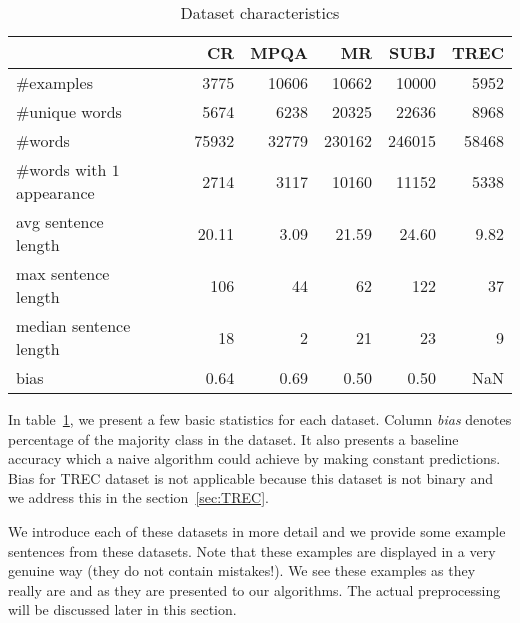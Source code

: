    \begin{table}[h]
    \begin{center}
    
    \begin{tabular}{l|rrrrr}
    \toprule
    {} &        CR &      MPQA &         MR &      SUBJ &      TREC \\\hline
    \midrule
    \#examples                                &   3775 &  10606 &   10662 &   10000 &   5952 \\\hline
    \#unique words                            &   5674 &   6238 &   20325 &   22636 &   8968 \\\hline
    \#words                                   &  75932 &  32779 &  230162 &  246015 &  58468 \\\hline
    \specialcell{\#words with\\$1$ appearance} &   2714 &   3117 &   10160 &   11152 &   5338 \\\hline
    \specialcell{avg sentence\\length}       &     20.11 &      3.09 &      21.59 &      24.60 &      9.82 \\\hline
    \specialcell{max sentence\\length}       &    106 &     44 &      62 &     122 &     37 \\\hline
    \specialcell{median sentence\\length}    &     18 &      2 &      21 &      23 &      9 \\\hline
    bias                                     &      0.64 &      0.69 &       0.50 &       0.50 &       NaN \\
    \bottomrule
    \end{tabular}
    
    \caption[Dataset characteristics]{Dataset characteristics}
    \label{tab:datasets:stats}
    \end{center}
    \end{table}


    In table~\ref{tab:datasets:stats}, we present a few basic statistics for each dataset.
    Column \emph{bias} denotes percentage of the majority class in the dataset.
    It also presents a baseline accuracy which a naive algorithm could achieve by making constant predictions. 
    Bias for TREC dataset is not applicable because this dataset is not binary and we address this in the section~\ref{sec:TREC}.
    
    We introduce each of these datasets in more detail and we provide some example sentences from these datasets.
    Note that these examples are displayed in a very genuine way (they do not contain mistakes!). 
    We see these examples as they really are and as they are presented to our algorithms.
    The actual preprocessing will be discussed later in this section.
    
